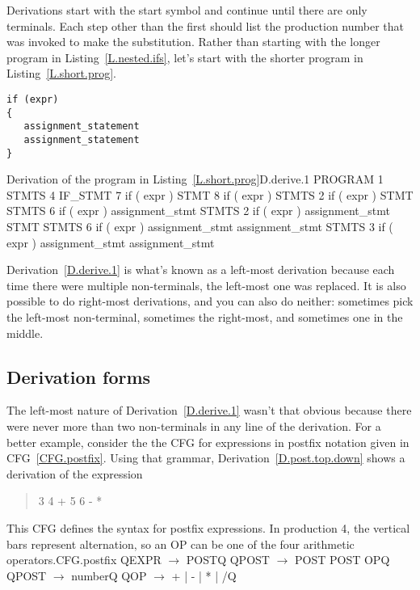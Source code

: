 \documentclass[letterpaper,12pt,openany,reqno]{book}%
\newcommand{\cfgprod}[2] {{\ttfamily #1} $\rightarrow$ {\ttfamily #2}}
\begin{document}
Derivations start with the start symbol and continue until there are only terminals. Each step other than the first should list the production number that was invoked to make the substitution. Rather than starting with the longer program in Listing~\ref{L.nested.ifs}, let's start with the shorter program in Listing~\ref{L.short.prog}.

\begin{lstlisting}[caption={Short program program in the language defined by the CFG in CFG~\ref{F.cfg.2}. The derivation of this program is given in Derivation~\ref{D.derive.1}},label=L.short.prog]
if (expr)
{
   assignment_statement
   assignment_statement
}
\end{lstlisting}

\begin{derivation}{Derivation of the program in Listing~\ref{L.short.prog}}{D.derive.1}
    PROGRAM
1   STMTS
4   IF_STMT
7   if ( expr ) STMT
8   if ( expr ) { STMTS }
2   if ( expr ) { STMT STMTS }
6   if ( expr ) { assignment_stmt STMTS }
2   if ( expr ) { assignment_stmt STMT STMTS }
6   if ( expr ) { assignment_stmt assignment_stmt STMTS }
3   if ( expr ) { assignment_stmt assignment_stmt }
\end{derivation}

Derivation~\ref{D.derive.1} is what's known as a left-most derivation because each time there were multiple non-terminals, the left-most one was replaced. It is also possible to do right-most derivations, and you can also do neither: sometimes pick the left-most non-terminal, sometimes the right-most, and sometimes one in the middle.

\subsection{Derivation forms}\label{S.derive.forms}
The left-most nature of Derivation~\ref{D.derive.1} wasn't that obvious because there were never more than two non-terminals in any line of the derivation. For a better example, consider the the CFG for expressions in postfix notation given in CFG~\ref{CFG.postfix}. Using that grammar, Derivation~\ref{D.post.top.down} shows a derivation of the expression
\begin{quote}
3 4 + 5 6 - *
\end{quote}
\begin{cfg}{This CFG defines the syntax for postfix expressions. In production 4, the vertical bars represent alternation, so an OP can be one of the four arithmetic operators.}{CFG.postfix}
Q\cfgprod{EXPR}{POST}Q
Q\cfgprod{POST}{POST POST OP}Q
Q\cfgprod{POST}{number}Q
Q\cfgprod{OP}{+ | - | * | /}Q
\end{cfg}
\end{document}
